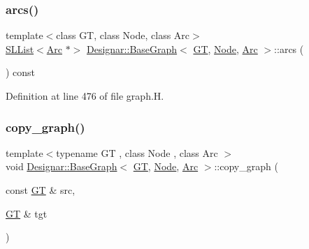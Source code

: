 \subsubsection{\texorpdfstring{arcs()}{arcs()}}
{\footnotesize\ttfamily template$<$class GT, class Node, class Arc$>$ \\
\hyperlink{class_designar_1_1_s_l_list}{S\+L\+List}$<$\hyperlink{namespace_designar_a3f55fb5513d62ff47cbc8f72b8e95d6f}{Arc} $\ast$$>$ \hyperlink{class_designar_1_1_base_graph}{Designar\+::\+Base\+Graph}$<$ \hyperlink{demo-buildgraph_8_c_a3001c40d2c31ca87ed96cd7d1334a55e}{GT}, \hyperlink{namespace_designar_a5af326c65aa2bd26b26c410f2030d09e}{Node}, \hyperlink{namespace_designar_a3f55fb5513d62ff47cbc8f72b8e95d6f}{Arc} $>$\+::arcs (\begin{DoxyParamCaption}{ }\end{DoxyParamCaption}) const\hspace{0.3cm}{\ttfamily [inline]}}



Definition at line 476 of file graph.\+H.

\mbox{\label{class_designar_1_1_base_graph_ac34a3b513973c2ed43067934f71ace28}} 
\subsubsection{\texorpdfstring{copy\+\_\+graph()}{copy\_graph()}}
{\footnotesize\ttfamily template$<$typename GT , class Node , class Arc $>$ \\
void \hyperlink{class_designar_1_1_base_graph}{Designar\+::\+Base\+Graph}$<$ \hyperlink{demo-buildgraph_8_c_a3001c40d2c31ca87ed96cd7d1334a55e}{GT}, \hyperlink{namespace_designar_a5af326c65aa2bd26b26c410f2030d09e}{Node}, \hyperlink{namespace_designar_a3f55fb5513d62ff47cbc8f72b8e95d6f}{Arc} $>$\+::copy\+\_\+graph (\begin{DoxyParamCaption}\item[{const \hyperlink{demo-buildgraph_8_c_a3001c40d2c31ca87ed96cd7d1334a55e}{GT} \&}]{src,  }\item[{\hyperlink{demo-buildgraph_8_c_a3001c40d2c31ca87ed96cd7d1334a55e}{GT} \&}]{tgt }\end{DoxyParamCaption})\hspace{0.3cm}{\ttfamily [static]}}



